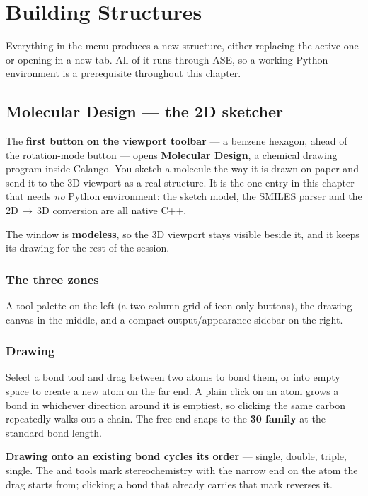 \chapter{Building Structures}
\label{ch:building}

Everything in the  menu produces a new structure, either
replacing the active one or opening in a new tab. All of it runs through
ASE, so a working Python environment is a prerequisite throughout this
chapter.

\section{Molecular Design --- the 2D sketcher}
\label{sec:molecular-design}

The \textbf{first button on the viewport toolbar} --- a benzene hexagon,
ahead of the rotation-mode button --- opens \textbf{Molecular Design}, a
chemical drawing program inside Calango. You sketch a molecule the way it
is drawn on paper and send it to the 3D viewport as a real structure. It is
the one entry in this chapter that needs \emph{no} Python environment: the
sketch model, the SMILES parser and the 2D\,$\rightarrow$\,3D conversion are
all native C++.

The window is \textbf{modeless}, so the 3D viewport stays visible beside it,
and it keeps its drawing for the rest of the session.

\subsection{The three zones}

A tool palette on the left (a two-column grid of icon-only buttons), the
drawing canvas in the middle, and a compact output/appearance sidebar on the
right.

\subsection{Drawing}

Select a bond tool and drag between two atoms to bond them, or into empty
space to create a new atom on the far end. A plain click on an atom grows a
bond in whichever direction around it is emptiest, so clicking the same
carbon repeatedly walks out a chain. The free end snaps to the
\textbf{30\textdegree{} family} at the standard bond length.

\textbf{Drawing onto an existing bond cycles its order} --- single, double,
triple, single. The  and  tools mark stereochemistry with
the narrow end on the atom the drag starts from; clicking a bond that
already carries that mark reverses it.

